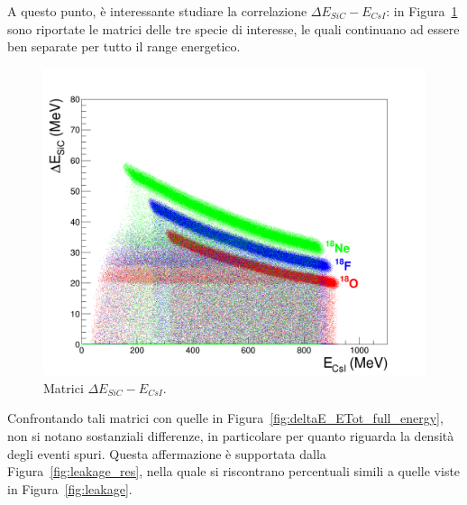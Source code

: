 A questo punto, è interessante studiare la correlazione $\Delta E_{SiC} - E_{CsI}$: in Figura~\ref{fig:deltaE_ERes} sono riportate le matrici delle tre specie di interesse, le quali continuano ad essere ben separate per tutto il range energetico.
\begin{figure} [!p]
	\centering
	\includegraphics[width=\textwidth, keepaspectratio]{Grafici_Tesi/Particelle_non_monocromatiche_Resid/deltaE_ERes.png}
	\caption{Matrici $\Delta E_{SiC} - E_{CsI}$.} \label{fig:deltaE_ERes}
\end{figure} 
Confrontando tali matrici con quelle in Figura~\ref{fig:deltaE_ETot_full_energy}, non si notano sostanziali differenze, in particolare per quanto riguarda la densità degli eventi spuri.
Questa affermazione è supportata dalla Figura~\ref{fig:leakage_res}, nella quale si riscontrano percentuali simili a quelle viste in Figura~\ref{fig:leakage}.
